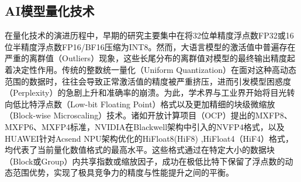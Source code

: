 \documentclass[10.5pt,compsoc,UTF8]{CjC}
\theoremstyle{mystyle}
\begin{document}
\subsection{AI模型量化技术}
在量化技术的演进历程中，早期的研究主要集中在将32位单精度浮点数FP32或16位半精度浮点数FP16/BF16压缩为INT8\cite{int8quant}。然而，大语言模型的激活值中普遍存在严重的离群值（Outliers）现象，这些长尾分布的离群值对模型的最终输出精度起着决定性作用。传统的整数统一量化（Uniform Quantization）\cite{int8quant}在面对这种高动态范围的数据时，往往会导致正常激活值的精度被严重挤压，进而引发模型困惑度（Perplexity）的急剧上升和准确率的崩溃。为此，学术界与工业界开始将目光转向低比特浮点数（Low-bit Floating Point）格式以及更加精细的块级微缩放（Block-wise Microscaling）技术。诸如开放计算项目（OCP）提出的MXFP8、MXFP6、MXFP4标准\cite{rouhani2023microscaling}，NVIDIA在Blackwell架构中引入的NVFP4\cite{nvidia2024nvfp4}格式，以及HUAWEI针对Acsend NPU架构优化的HiFloat8\cite{hifloat8}(HiF8) ,HiFloat4\cite{hifloat4}（HiF4）格式，均代表了当前量化数值格式的最高水平。这些格式通过在特定大小的数据块（Block或Group）内共享指数或缩放因子，成功在极低比特下保留了浮点数的动态范围优势，实现了极具竞争力的精度与性能提升之间的平衡。
\end{document}
